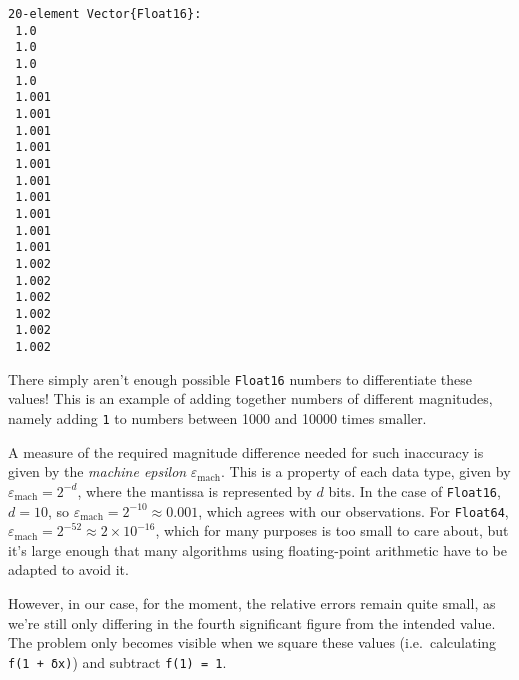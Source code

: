 \documentclass[
  letterpaper,
  DIV=11,
  numbers=noendperiod]{scrreprt}
\begin{document}
\begin{verbatim}
20-element Vector{Float16}:
 1.0
 1.0
 1.0
 1.0
 1.001
 1.001
 1.001
 1.001
 1.001
 1.001
 1.001
 1.001
 1.001
 1.001
 1.002
 1.002
 1.002
 1.002
 1.002
 1.002
\end{verbatim}

There simply aren't enough possible \texttt{Float16} numbers to
differentiate these values! This is an example of adding together
numbers of different magnitudes, namely adding \texttt{1} to numbers
between 1000 and 10000 times smaller.

A measure of the required magnitude difference needed for such
inaccuracy is given by the \emph{machine epsilon}
\(\varepsilon_\mathrm{mach}\). This is a property of each data type,
given by \(\varepsilon_\mathrm{mach} = 2^{-d}\), where the mantissa is
represented by \(d\) bits. In the case of \texttt{Float16}, \(d = 10\),
so \(\varepsilon_\mathrm{mach} = 2^{-10} \approx 0.001\), which agrees
with our observations. For \texttt{Float64},
\(\varepsilon_\mathrm{mach} = 2^{-52} \approx 2 \times 10^{-16}\), which
for many purposes is too small to care about, but it's large enough that
many algorithms using floating-point arithmetic have to be adapted to
avoid it.

However, in our case, for the moment, the relative errors remain quite
small, as we're still only differing in the fourth significant figure
from the intended value. The problem only becomes visible when we square
these values (i.e.~calculating \texttt{f(1\ +\ δx)}) and subtract
\texttt{f(1)\ =\ 1}.
\end{document}
